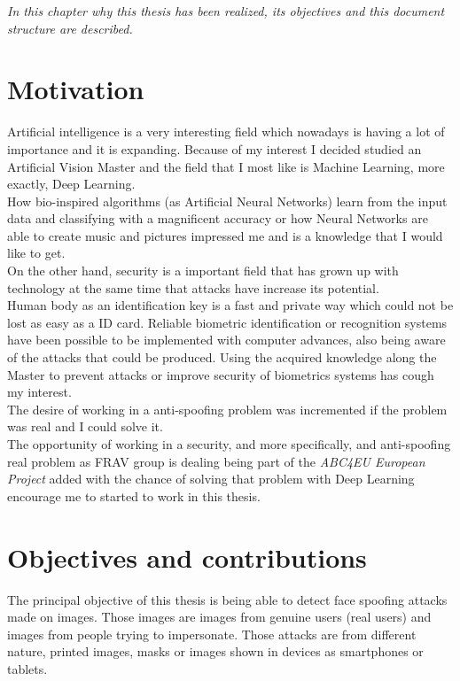 \minitoc
\mtcskip

\begin{small}
\emph{In this chapter why this thesis has been realized, its objectives and this document structure are described.\\}
\end{small}
\section{Motivation}
Artificial intelligence is a very interesting field which nowadays is having a lot of importance and it is expanding. Because of my interest I decided studied an Artificial Vision Master and the field that I most like is Machine Learning, more exactly, Deep Learning.\\

How bio-inspired algorithms (as Artificial Neural Networks) learn from the input data and classifying with a magnificent accuracy or how Neural Networks are able to create music and pictures impressed me and is a knowledge that I would like to get.\\

On the other hand, security is a important field that has grown up with technology at the same time that attacks have increase its potential.\\

Human body as an identification key is a fast and private way which could not be lost as easy as a ID card. Reliable biometric identification or recognition  systems have been possible to be implemented with computer advances, also being aware of the attacks that could be produced. Using the acquired knowledge along the Master to prevent attacks or improve security of biometrics systems has cough my interest.\\

The desire of working in a anti-spoofing problem was incremented if the problem was real and I could solve it.\\

The opportunity of working in a security, and more specifically, and anti-spoofing real problem as FRAV group is dealing being part of the \textit{ABC4EU European Project} added with the chance of solving that problem with Deep Learning encourage me to started to work in this thesis.\\

\section{Objectives and contributions}
The principal objective of this thesis is being able to detect face spoofing attacks made on images. Those images are images from genuine users (real users) and images from people trying to impersonate. Those attacks are from different nature, printed images, masks or images shown in devices as smartphones or tablets.\\

